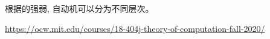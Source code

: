 
\begin{frame}{}
  \begin{center}

    \vspace{0.50cm}
    根据的强弱, 自动机可以分为不同层次。
  \end{center}
\end{frame}

\begin{frame}{}
	\begin{center}

		\vspace{0.30cm}
		\url{https://ocw.mit.edu/courses/18-404j-theory-of-computation-fall-2020/}
	\end{center}
\end{frame}
